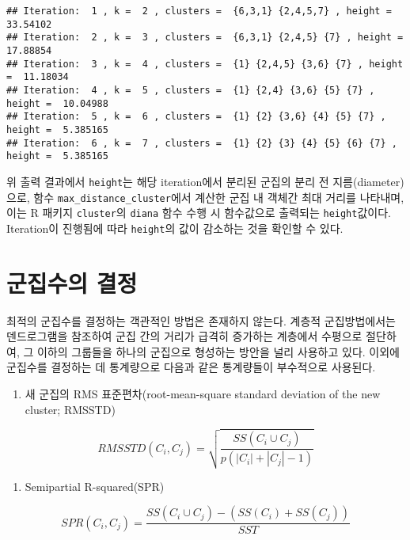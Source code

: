 \documentclass[]{book}
\providecommand{\tightlist}{%
  \setlength{\itemsep}{0pt}\setlength{\parskip}{0pt}}
\begin{document}
\begin{verbatim}
## Iteration:  1 , k =  2 , clusters =  {6,3,1} {2,4,5,7} , height =  33.54102 
## Iteration:  2 , k =  3 , clusters =  {6,3,1} {2,4,5} {7} , height =  17.88854 
## Iteration:  3 , k =  4 , clusters =  {1} {2,4,5} {3,6} {7} , height =  11.18034 
## Iteration:  4 , k =  5 , clusters =  {1} {2,4} {3,6} {5} {7} , height =  10.04988 
## Iteration:  5 , k =  6 , clusters =  {1} {2} {3,6} {4} {5} {7} , height =  5.385165 
## Iteration:  6 , k =  7 , clusters =  {1} {2} {3} {4} {5} {6} {7} , height =  5.385165
\end{verbatim}

위 출력 결과에서 \texttt{height}는 해당 iteration에서 분리된 군집의 분리 전 지름(diameter)으로, 함수 \texttt{max\_distance\_cluster}에서 계산한 군집 내 객체간 최대 거리를 나타내며, 이는 R 패키지 \texttt{cluster}의 \texttt{diana} 함수 수행 시 함수값으로 출력되는 \texttt{height}값이다. Iteration이 진행됨에 따라 \texttt{height}의 값이 감소하는 것을 확인할 수 있다.

\hypertarget{hierarchical-cluster-number}{%
\section{군집수의 결정}\label{hierarchical-cluster-number}}

최적의 군집수를 결정하는 객관적인 방법은 존재하지 않는다. 계층적 군집방법에서는 덴드로그램을 참조하여 군집 간의 거리가 급격히 증가하는 계층에서 수평으로 절단하여, 그 이하의 그룹들을 하나의 군집으로 형성하는 방안을 널리 사용하고 있다. 이외에 군집수를 결정하는 데 통계량으로 다음과 같은 통계량들이 부수적으로 사용된다.

\begin{enumerate}
\def\labelenumi{\arabic{enumi}.}
\tightlist
\item
  새 군집의 RMS 표준편차(root-mean-square standard deviation of the new cluster; RMSSTD)
\end{enumerate}

\begin{equation*}
RMSSTD(C_i, C_j) = \sqrt{\frac{SS(C_i \cup C_j)}{p(|C_i| + |C_j| - 1)}}
\end{equation*}

\begin{enumerate}
\def\labelenumi{\arabic{enumi}.}
\setcounter{enumi}{1}
\tightlist
\item
  Semipartial R-squared(SPR)
\end{enumerate}

\begin{equation*}
SPR(C_i, C_j) = \frac{SS(C_i \cup C_j) - (SS(C_i) + SS(C_j))}{SST}
\end{equation*}
\end{document}
